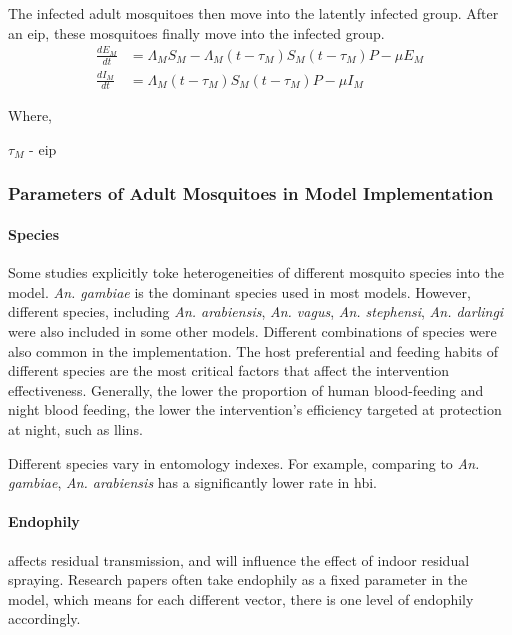 \documentclass[a4paper, 12pt, twoside]{report}
\begin{document}
The infected adult mosquitoes then move into the latently infected group.
After an \gls{eip}, these mosquitoes finally move into the infected group.
\begin{align}
  \frac{dE_M}{dt} & = \Lambda_M S_M - \Lambda_M (t- \tau_M) S_M (t - \tau_M) P - \mu E_M\\
  \frac{dI_M}{dt} & = \Lambda_M (t- \tau_M) S_M (t - \tau_M) P - \mu I_M
\end{align}

Where,
\begin{centering}
  $\tau_M$ - \gls{eip} \\
\end{centering}

\subsubsection{Parameters of Adult Mosquitoes in Model Implementation}
\paragraph{Species}%
\label{par:species}
Some studies explicitly toke heterogeneities of different mosquito species into the model.
\textit{An. gambiae} is the dominant species used in most models.
However, different species, including \textit{An. arabiensis}, \textit{An. vagus}, \textit{An. stephensi}, \textit{An. darlingi} were also included in some other models.
Different combinations of species were also common in the implementation.
The host preferential and feeding habits of different species are the most critical factors that affect the intervention effectiveness.
Generally, the lower the proportion of human blood-feeding and night blood feeding, the lower the intervention's efficiency targeted at protection at night, such as \gls{llins}.

Different species vary in entomology indexes.
For example, comparing to \textit{An. gambiae}, \textit{An. arabiensis} has a significantly lower rate in \gls{hbi}.

\paragraph{Endophily}%
\label{par:endophily}
affects residual transmission, and will influence the effect of indoor residual spraying.
Research papers often take endophily as a fixed parameter in the model, which means for each different vector, there is one level of endophily accordingly.
\end{document}
